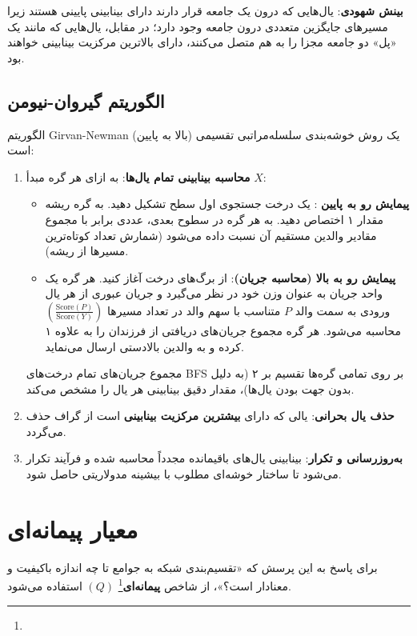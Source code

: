 \textbf{بینش شهودی}: یال‌هایی که درون یک جامعه قرار دارند دارای بینابینی پایینی هستند زیرا مسیرهای جایگزین متعددی درون جامعه وجود دارد؛ در مقابل، یال‌هایی که مانند یک «پل» دو جامعه مجزا را به هم متصل می‌کنند، دارای بالاترین مرکزیت بینابینی خواهند بود.

\subsection{الگوریتم گیروان-نیومن \texorpdfstring{}{(Girvan-Newman Algorithm)}}
الگوریتم Girvan-Newman یک روش خوشه‌بندی سلسله‌مراتبی تقسیمی (بالا به پایین) است:

\begin{algorithmbox}
\begin{enumerate}
    \item \textbf{محاسبه بینابینی تمام یال‌ها}: به ازای هر گره مبدأ $X$:
    \begin{itemize}
        \item \textbf{پیمایش رو به پایین }: یک درخت جستجوی اول سطح  تشکیل دهید. به گره ریشه مقدار ۱ اختصاص دهید. به هر گره در سطوح بعدی، عددی برابر با مجموع مقادیر والدین مستقیم آن نسبت داده می‌شود (شمارش تعداد کوتاه‌ترین مسیرها از ریشه).
        \item \textbf{پیمایش رو به بالا (محاسبه جریان)}: از برگ‌های درخت آغاز کنید. هر گره یک واحد جریان به عنوان وزن خود در نظر می‌گیرد و جریان عبوری از هر یال ورودی به سمت والد $P$ متناسب با سهم والد در تعداد مسیرها $(\frac{\text{Score}(P)}{\text{Score}(Y)})$ محاسبه می‌شود. هر گره مجموع جریان‌های دریافتی از فرزندان را به علاوه ۱ کرده و به والدین بالادستی ارسال می‌نماید.
    \end{itemize}
    مجموع جریان‌های تمام درخت‌های BFS بر روی تمامی گره‌ها تقسیم بر ۲ (به دلیل بدون جهت بودن یال‌ها)، مقدار دقیق بینابینی هر یال را مشخص می‌کند.
    \item \textbf{حذف یال بحرانی}: یالی که دارای \textbf{بیشترین مرکزیت بینابینی} است از گراف حذف می‌گردد.
    \item \textbf{به‌روزرسانی و تکرار}: بینابینی یال‌های باقیمانده مجدداً محاسبه شده و فرآیند تکرار می‌شود تا ساختار خوشه‌ای مطلوب با بیشینه مدولاریتی حاصل شود.
\end{enumerate}
\end{algorithmbox}

\section{معیار پیمانه‌ای \texorpdfstring{}{(Modularity)}}
برای پاسخ به این پرسش که «تقسیم‌بندی شبکه به جوامع تا چه اندازه باکیفیت و معنادار است؟»، از شاخص \textbf{پیمانه‌ای}\footnote{} $(Q)$ استفاده می‌شود.

